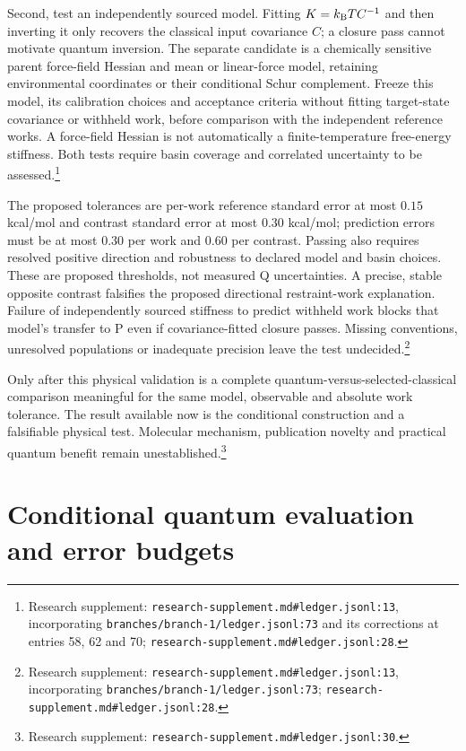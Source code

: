 \documentclass{article}
\begin{document}
Second, test an independently sourced model. Fitting \(K=k_{\rm B}T C^{-1}\) and then inverting it only recovers the classical input covariance \(C\); a closure pass cannot motivate quantum inversion. The separate candidate is a chemically sensitive parent force-field Hessian and mean or linear-force model, retaining environmental coordinates or their conditional Schur complement. Freeze this model, its calibration choices and acceptance criteria without fitting target-state covariance or withheld work, before comparison with the independent reference works. A force-field Hessian is not automatically a finite-temperature free-energy stiffness. Both tests require basin coverage and correlated uncertainty to be assessed.\footnote{Research supplement: \nolinkurl{research-supplement.md#ledger.jsonl:13}, incorporating \nolinkurl{branches/branch-1/ledger.jsonl:73} and its corrections at entries 58, 62 and 70; \nolinkurl{research-supplement.md#ledger.jsonl:28}.}

The proposed tolerances are per-work reference standard error at most \(0.15\) kcal/mol and contrast standard error at most \(0.30\) kcal/mol; prediction errors must be at most \(0.30\) per work and \(0.60\) per contrast. Passing also requires resolved positive direction and robustness to declared model and basin choices. These are proposed thresholds, not measured Q uncertainties. A precise, stable opposite contrast falsifies the proposed directional restraint-work explanation. Failure of independently sourced stiffness to predict withheld work blocks that model's transfer to P even if covariance-fitted closure passes. Missing conventions, unresolved populations or inadequate precision leave the test undecided.\footnote{Research supplement: \nolinkurl{research-supplement.md#ledger.jsonl:13}, incorporating \nolinkurl{branches/branch-1/ledger.jsonl:73}; \nolinkurl{research-supplement.md#ledger.jsonl:28}.}

Only after this physical validation is a complete quantum-versus-selected-classical comparison meaningful for the same model, observable and absolute work tolerance. The result available now is the conditional construction and a falsifiable physical test. Molecular mechanism, publication novelty and practical quantum benefit remain unestablished.\footnote{Research supplement: \nolinkurl{research-supplement.md#ledger.jsonl:30}.}

\appendix
\section{Conditional quantum evaluation and error budgets}\label{app:quantum}
\end{document}
